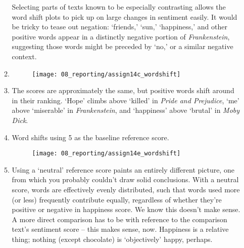 \begin{enumerate}
\begin{enumerate}
		Selecting parts of texts known to be especially contrasting allows the word shift plots to pick up on large changes in sentiment easily. It would be tricky to tease out negation: `friends,' `sun,' `happiness,' and other positive words appear in a distinctly negative portion of \textit{Frankenstein}, suggesting those words might be preceded by `no,' or a similar negative context. 
		
		
		\item 
	
			\begin{figure}[H]
	  				\centering
	  				\texttt{[image: 08\_reporting/assign14c\_wordshift]}
	  				\label{fig:wordshift_rev}
	  			\end{figure}
	
		
		\item 
		
		The scores are approximately the same, but positive words shift around in their ranking. `Hope' climbs above `killed' in \textit{Pride and Prejudice}, `me' above `miserable' in \textit{Frankenstein}, and `happiness' above `brutal' in \textit{Moby Dick}.
		
		\item 
		Word shifts using 5 as the baseline reference score.
		
	      	\begin{figure}[H]
		       	\centering
		       	\texttt{[image: 08\_reporting/assign14e\_wordshift]}
		       	\label{fig:wordshift_ref}
	    	\end{figure}
	
		
		\item 
		Using a `neutral' reference score paints an entirely different picture, one from which you probably couldn't draw solid conclusions. With a neutral score, words are effectively evenly distributed, such that words used more (or less) frequently contribute equally, regardless of whether they're positive or negative in happiness score. We know this doesn't make sense. A more direct comparison has to be with reference to the comparison text's sentiment score -- this makes sense, now. Happiness is a relative thing; nothing (except chocolate) is `objectively' happy, perhaps.
   
		
	

	\end{enumerate}

   \solutionend

\end{enumerate}

